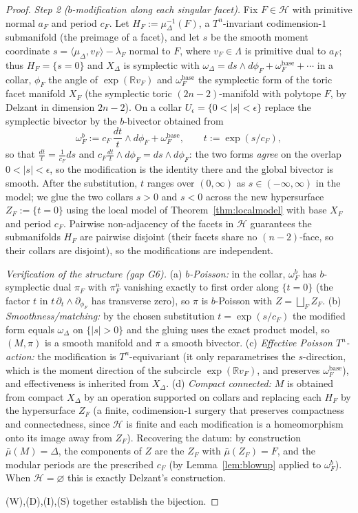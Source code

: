 \documentclass{amsart}
\theoremstyle{definition}
\begin{document}
\begin{proof}
\emph{Step 2 ($b$-modification along each singular facet).} Fix $F\in\mathcal H$
with primitive normal $a_F$ and period $c_F$. Let $H_F:=\mu_\Delta^{-1}(F)$, a
$T^n$-invariant codimension-$1$ submanifold (the preimage of a facet), and let
$s$ be the smooth moment coordinate $s=\langle\mu_\Delta,v_F\rangle-\lambda_F$
normal to $F$, where $v_F\in\Lambda$ is primitive dual to $a_F$; thus $H_F=
\{s=0\}$ and $X_\Delta$ is symplectic with $\omega_\Delta=ds\wedge d\phi_F+
\omega_F^{\mathrm{base}}+\cdots$ in a collar, $\phi_F$ the angle of
$\exp(\mathbb R v_F)$ and $\omega_F^{\mathrm{base}}$ the symplectic form of the
toric facet manifold $X_F$ (the symplectic toric $(2n-2)$-manifold with polytope
$F$, by Delzant in dimension $2n-2$). On a collar
$U_\epsilon=\{0<|s|<\epsilon\}$ replace the symplectic bivector by the
$b$-bivector obtained from
\[
\omega_F^{b}:=c_F\,\frac{dt}{t}\wedge d\phi_F+\omega_F^{\mathrm{base}},\qquad
t:=\exp(s/c_F),
\]
so that $\tfrac{dt}{t}=\tfrac1{c_F}ds$ and $c_F\tfrac{dt}{t}\wedge d\phi_F=
ds\wedge d\phi_F$: the two forms \emph{agree} on the overlap $0<|s|<\epsilon$,
so the modification is the identity there and the global bivector is smooth.
After the substitution, $t$ ranges over $(0,\infty)$ as $s\in(-\infty,\infty)$
in the model; we glue the two collars $s>0$ and $s<0$ across the new
hypersurface $Z_F:=\{t=0\}$ using the local model of
Theorem~\ref{thm:localmodel} with base $X_F$ and period $c_F$. Pairwise
non-adjacency of the facets in $\mathcal H$ guarantees the submanifolds $H_F$
are pairwise disjoint (their facets share no $(n-2)$-face, so their collars are
disjoint), so the modifications are independent.

\emph{Verification of the structure (gap G6).} (a) \emph{$b$-Poisson:} in the
collar, $\omega_F^b$ has $b$-symplectic dual $\pi_F$ with $\pi_F^n$ vanishing
exactly to first order along $\{t=0\}$ (the factor $t$ in $t\,\partial_t\wedge
\partial_{\phi_F}$ has transverse zero), so $\pi$ is $b$-Poisson with $Z=
\bigsqcup_F Z_F$. (b) \emph{Smoothness/matching:} by the chosen substitution
$t=\exp(s/c_F)$ the modified form equals $\omega_\Delta$ on $\{|s|>0\}$ and the
gluing uses the exact product model, so $(M,\pi)$ is a smooth manifold and
$\pi$ a smooth bivector. (c) \emph{Effective Poisson $T^n$-action:} the
modification is $T^n$-equivariant (it only reparametrises the $s$-direction,
which is the moment direction of the subcircle $\exp(\mathbb R v_F)$, and
preserves $\omega_F^{\mathrm{base}}$), and effectiveness is inherited from
$X_\Delta$. (d) \emph{Compact connected:} $M$ is obtained from compact
$X_\Delta$ by an operation supported on collars and replacing each $H_F$ by the
hypersurface $Z_F$ (a finite, codimension-$1$ surgery that preserves
compactness and connectedness, since $\mathcal H$ is finite and each
modification is a homeomorphism onto its image away from $Z_F$). Recovering the
datum: by construction $\bar\mu(M)=\Delta$, the components of $Z$ are the
$Z_F$ with $\bar\mu(Z_F)=F$, and the modular periods are the prescribed $c_F$
(by Lemma~\ref{lem:blowup} applied to $\omega_F^b$). When $\mathcal H=
\varnothing$ this is exactly Delzant's construction.

\medskip
(W),(D),(I),(S) together establish the bijection.
\end{proof}
\end{document}
